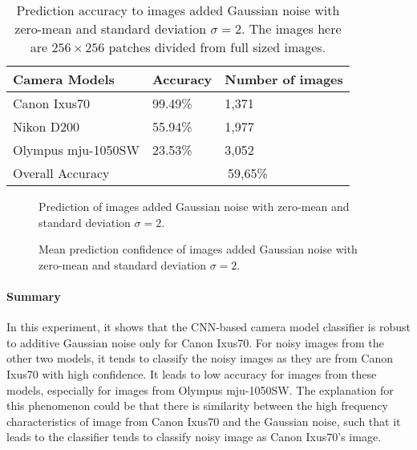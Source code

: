\documentclass[a4paper, 9pt, twocolumn]{extarticle}
\begin{document}
\begin{table}
	\center
	\begin{tabular}{ |p{3.2cm}|p{1.4cm}|p{2.6cm}| }
		\hline
		Camera Models & Accuracy & Number of images \\
		\hline
		Canon Ixus70 & 99.49\% & 1,371 \\
		Nikon D200 & 55.94\% & 1,977 \\
		Olympus mju-1050SW & 23.53\% & 3,052 \\
		\hline
		Overall Accuracy & \multicolumn{2}{c|}{59,65\%} \\
		\hline
	\end{tabular}
	\caption{\label{tab:noise} Prediction accuracy to images added Gaussian noise with zero-mean and standard deviation $ \sigma = 2 $. The images here are $ 256 \times 256 $ patches divided from full sized images.}
\end{table}

\begin{figure}
\centering
\resizebox{!}{!}{
	{}
}
\caption{Prediction of images added Gaussian noise with zero-mean and standard deviation $ \sigma = 2 $.}
\label{fig:noise result}
\end{figure}


\begin{figure}
	\centering
	\resizebox{!}{!}{
		{}
	}
	\caption{Mean prediction confidence of images added Gaussian noise with zero-mean and standard deviation $ \sigma = 2 $.}
	\label{fig:noise confidence}
\end{figure}

\paragraph{Summary}
\label{section:noise summary}

In this experiment, it shows that the CNN-based camera model classifier is robust to additive Gaussian noise only for Canon Ixus70. For noisy images from the other two models, it tends to classify the noisy images as they are from Canon Ixus70 with high confidence. It leads to low accuracy for images from these models, especially for images from Olympus mju-1050SW. The explanation for this phenomenon could be that there is similarity between the high frequency characteristics of image from Canon Ixus70 and the Gaussian noise, such that it leads to the classifier tends to classify noisy image as Canon Ixus70's image.
\end{document}
